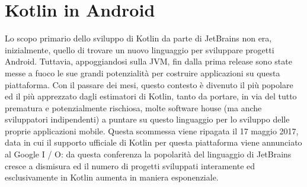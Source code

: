 
\chapter{Kotlin in Android}\label{ch:android}
Lo scopo primario dello sviluppo di Kotlin da parte di JetBrains non era, inizialmente, quello di trovare un nuovo linguaggio per sviluppare progetti Android. Tuttavia, appoggiandosi sulla JVM, fin dalla prima release sono state messe a fuoco le sue grandi potenzialità per costruire applicazioni su questa piattaforma. Con il passare dei mesi, questo contesto è divenuto il più popolare ed il più apprezzato dagli estimatori di Kotlin, tanto da portare, in via del tutto prematura e potenzialmente rischiosa, molte software house (ma anche sviluppatori indipendenti) a puntare su questo linguaggio per lo sviluppo delle proprie applicazioni mobile. Questa scommessa viene ripagata il 17 maggio 2017, data in cui il supporto ufficiale di Kotlin per questa piattaforma viene annunciato al Google I / O: da questa conferenza la popolarità del linguaggio di JetBrains cresce a dismisura ed il numero di progetti sviluppati interamente ed esclusivamente in Kotlin aumenta in maniera esponenziale.\\

